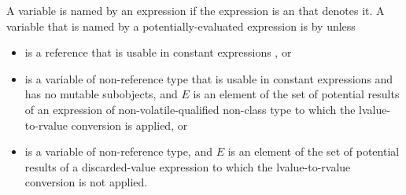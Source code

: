 \documentclass{wg21}
\begin{document}
\label{term.odr.use}%
A variable is named by an expression
if the expression is an  that denotes it.
A variable  that is named by a
potentially-evaluated expression 
is  by  unless
\begin{removedblock}
\begin{itemize}
    \item
     is a reference that is
    usable in constant expressions , or
    \item
     is a variable of non-reference type that is
    usable in constant expressions and has no mutable subobjects, and
    $E$ is an element of the set of potential results of an expression
    of non-volatile-qualified non-class type
    to which the lvalue-to-rvalue conversion  is applied, or
    \item
     is a variable of non-reference type, and
    $E$ is an element of the set of potential results
    of a discarded-value expression 
    to which the lvalue-to-rvalue conversion is not applied.
\end{itemize}
\end{removedblock}

\end{document}
